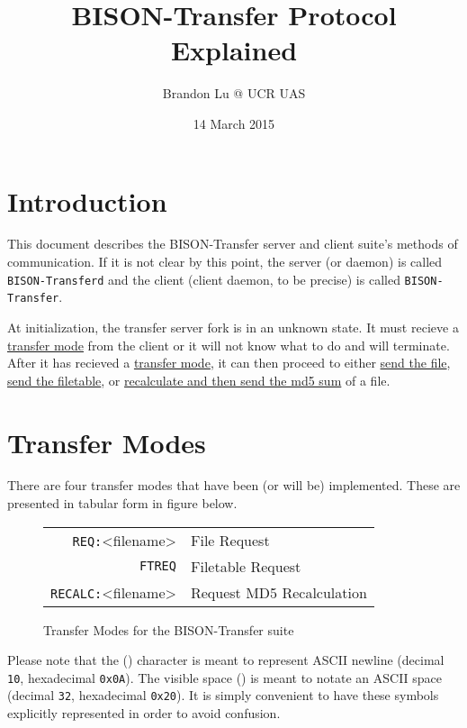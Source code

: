 \documentclass[12pt]{article}
\author{Brandon Lu @ UCR UAS}
\title{BISON-Transfer Protocol Explained}
\date{14 March 2015}
\begin{document}
\maketitle
\section{Introduction}
This document describes the BISON-Transfer server and client suite's methods
of communication.  If it is not clear by this point, the server (or daemon)
is called \verb+BISON-Transferd+ and the client (client daemon, to be precise)
is called \verb+BISON-Transfer+.

At initialization, the transfer server fork is in an unknown state.  It must
recieve a \hyperref[sec:Transfer Modes]{transfer mode} from the client or it
will not know what to
do and will terminate.
After it has recieved a \hyperref[sec:Transfer Modes]{transfer mode}, it can
then proceed to either \hyperref[ssec:Request File]{send the file},
\hyperref[ssec:Request Filetable]{send the filetable},
or \hyperref[ssec:Recalculate MD5]
{recalculate and then send the md5 sum} of a file. 

\tableofcontents

\section{Transfer Modes}
\label{sec:Transfer Modes}
There are four transfer modes that have been (or will be) implemented.
These are presented in tabular form in figure below.
\begin{figure}[h!]
	\centering
	\begin{tabular}{r l}
		\verb+REQ:+\textvisiblespace <filename>\carriagereturn\carriagereturn
		& File Request\\
		\verb+FTREQ+\carriagereturn\carriagereturn & Filetable Request \\
		\verb+RECALC:+\textvisiblespace <filename>\carriagereturn
		\carriagereturn & Request MD5 Recalculation
	\end{tabular}
	\label{fig:Transfer Modes}
	\caption{Transfer Modes for the BISON-Transfer suite}
\end{figure}

Please note that the (\carriagereturn) character is meant to represent ASCII
newline (decimal \verb+10+, hexadecimal \verb+0x0A+).  The
visible space (\textvisiblespace) is meant to notate an ASCII space (decimal
\verb+32+, hexadecimal \verb+0x20+).
It is simply convenient to have these symbols explicitly represented in order
to avoid confusion.
\end{document}

